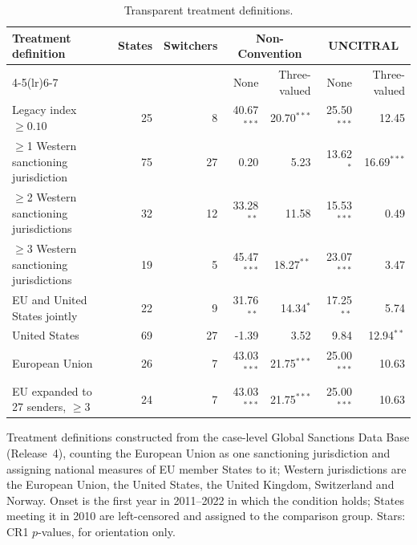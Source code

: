 \begin{table}[t]
\centering
\caption{Transparent treatment definitions.}
\label{tab:familygen}
\small
\begin{tabular}{lrrrrrr}
\toprule
Treatment definition & States & Switchers & \multicolumn{2}{c}{Non-Convention} & \multicolumn{2}{c}{UNCITRAL} \\
\cmidrule(lr){4-5}\cmidrule(lr){6-7}
 & & & None & Three-valued & None & Three-valued \\
\midrule
Legacy index $\geq 0.10$ & 25 & 8 & 40.67$^{***}$ & 20.70$^{***}$ & 25.50$^{***}$ & 12.45 \\
$\geq$1 Western sanctioning jurisdiction & 75 & 27 & 0.20 & 5.23 & 13.62$^{*}$ & 16.69$^{***}$ \\
$\geq$2 Western sanctioning jurisdictions & 32 & 12 & 33.28$^{**}$ & 11.58 & 15.53$^{***}$ & 0.49 \\
$\geq$3 Western sanctioning jurisdictions & 19 & 5 & 45.47$^{***}$ & 18.27$^{**}$ & 23.07$^{***}$ & 3.47 \\
EU and United States jointly & 22 & 9 & 31.76$^{**}$ & 14.34$^{*}$ & 17.25$^{**}$ & 5.74 \\
United States & 69 & 27 & -1.39 & 3.52 & 9.84 & 12.94$^{**}$ \\
European Union & 26 & 7 & 43.03$^{***}$ & 21.75$^{***}$ & 25.00$^{***}$ & 10.63 \\
EU expanded to 27 senders, $\geq 3$ & 24 & 7 & 43.03$^{***}$ & 21.75$^{***}$ & 25.00$^{***}$ & 10.63 \\
\bottomrule
\end{tabular}
\par\medskip
\begin{minipage}{0.95\linewidth}\footnotesize
Treatment definitions constructed from the case-level Global Sanctions Data Base (Release~4), counting the European Union as one sanctioning jurisdiction and assigning national measures of EU member States to it; Western jurisdictions are the European Union, the United States, the United Kingdom, Switzerland and Norway. Onset is the first year in 2011--2022 in which the condition holds; States meeting it in 2010 are left-censored and assigned to the comparison group. Stars: CR1 $p$-values, for orientation only.
\end{minipage}
\end{table}
